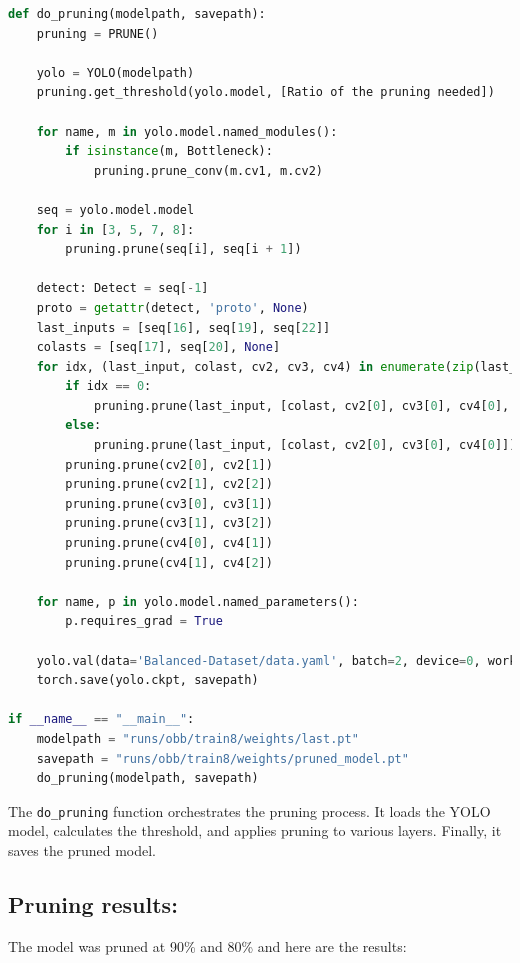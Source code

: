 \begin{lstlisting}[language=Python]
def do_pruning(modelpath, savepath):
    pruning = PRUNE()

    yolo = YOLO(modelpath)
    pruning.get_threshold(yolo.model, [Ratio of the pruning needed])

    for name, m in yolo.model.named_modules():
        if isinstance(m, Bottleneck):
            pruning.prune_conv(m.cv1, m.cv2)

    seq = yolo.model.model
    for i in [3, 5, 7, 8]:
        pruning.prune(seq[i], seq[i + 1])

    detect: Detect = seq[-1]
    proto = getattr(detect, 'proto', None)
    last_inputs = [seq[16], seq[19], seq[22]]
    colasts = [seq[17], seq[20], None]
    for idx, (last_input, colast, cv2, cv3, cv4) in enumerate(zip(last_inputs, colasts, detect.cv2, detect.cv3, detect.cv4)):
        if idx == 0:
            pruning.prune(last_input, [colast, cv2[0], cv3[0], cv4[0], proto] if proto else [colast, cv2[0], cv3[0], cv4[0]])
        else:
            pruning.prune(last_input, [colast, cv2[0], cv3[0], cv4[0]])
        pruning.prune(cv2[0], cv2[1])
        pruning.prune(cv2[1], cv2[2])
        pruning.prune(cv3[0], cv3[1])
        pruning.prune(cv3[1], cv3[2])
        pruning.prune(cv4[0], cv4[1])
        pruning.prune(cv4[1], cv4[2])

    for name, p in yolo.model.named_parameters():
        p.requires_grad = True

    yolo.val(data='Balanced-Dataset/data.yaml', batch=2, device=0, workers=0)
    torch.save(yolo.ckpt, savepath)

if __name__ == "__main__":
    modelpath = "runs/obb/train8/weights/last.pt"
    savepath = "runs/obb/train8/weights/pruned_model.pt"
    do_pruning(modelpath, savepath)
\end{lstlisting}

The \texttt{do\_pruning} function orchestrates the pruning process. It loads the YOLO model, calculates the threshold, and applies pruning to various layers. Finally, it saves the pruned model.


\subsection{Pruning results:}
The model was pruned at 90\% and 80\% and here are the results:

